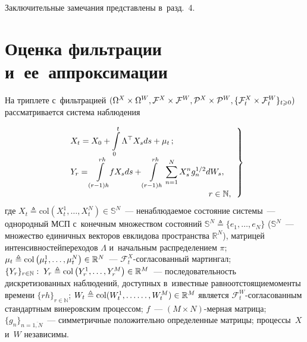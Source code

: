 \begin{multicols}{2}
Заключительные замечания 
представлены в~разд.~4.

 
\section{Оценка фильтрации и~ее~аппроксимации}


 На триплете с~фильтрацией $(\Omega^X \times \Omega^W,\mathcal{F}^X 
\hm\times \mathcal{F}^W,
 \mathcal{P}^X \hm\times \mathcal{P}^W, \{\mathcal{F}^X_t \times 
\mathcal{F}^W_t\}_{t \geqslant 0})$ рассматривается система наблюдения


\noindent
\begin{equation}
 \left.
 \begin{array}{ll}
\displaystyle
X_t =X_0 + \int\limits_0^t \Lambda^{\top}X_{s}ds + \mu_t\,; & \\[6pt]
 \displaystyle Y_r = \int\limits_{(r-1)h}^{rh}\!\! fX_sds+ 
\int\limits_{(r-1)h}^{rh} \sum\limits_{n=1}^NX_s^ng_n^{1/2} dW_s, &\\[6pt]
 &\hspace*{-10mm}r \in \mathbb{N},
 \end{array}
 \right\}
 \label{eq:obsys_1}
 \end{equation}
 где
 $X_t \triangleq \mathrm{col}\left(X_t^1,\ldots,X_t^N\right) \in 
\mathbb{S}^N$~--- не\-на\-блю\-да\-емое состояние системы~--- однородный МСП 
с~конечным множеством состояний $ \mathbb{S}^N \triangleq 
\{e_1,\ldots,e_N\}$ ($\mathbb{S}^N$~--- множество единичных векторов 
евклидова пространства $\mathbb{R}^N$), матрицей интенсивностей\linebreak переходов 
$\Lambda$ и~начальным распределением $\pi$;
 $\mu_t \hm\triangleq \mathrm{col}\left(
 \mu_t^1,\ldots,\mu_t^N\right)\hm\in \mathbb{R}^N$~--- 
$\mathcal{F}_t^X$-со\-гла\-со\-ван\-ный мартингал;
 $\{Y_r\}_{r \in \mathbb{N}}:\; Y_r \hm\triangleq 
\mathrm{col}\left(Y_r^1,\ldots,Y_r^M\right) \hm\in \mathbb{R}^M$~--- 
последовательность дискретизованных наблюдений, доступных в~известные 
равноотстоящие\linebreak моменты времени $\{rh\}_{r \in \mathbb{N}}$;
$W_t \triangleq \mathrm{col}(W_t^1,\ldots\linebreak \ldots ,W_t^M) \hm\in \mathbb{R}^M$ 
является
$\mathcal{F}_t^W$-со\-гла\-со\-ван\-ным стандартным винеровским процессом;
 $f$~--- $(M \times N)$-мер\-ная мат\-ри\-ца;
 $\{g_n\}_{n=\overline{1,N}}$~--- симметричные положительно определенные 
матрицы; процессы~$X$ и~$W$ независимы.


\end{multicols}
